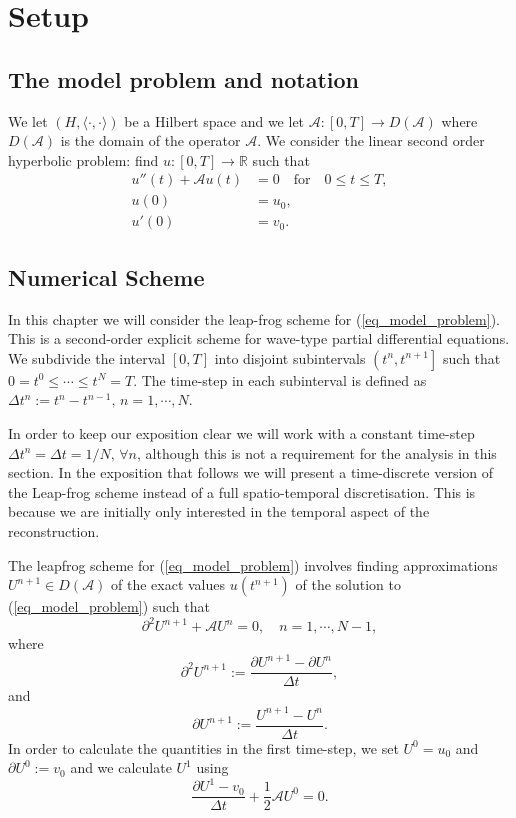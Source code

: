 \documentclass[12pt,a4paper]{article}
\numberwithin{equation}{section}
\theoremstyle{definition}
\newcommand{\qp}[1]{\left(#1\right)}
\newcommand{\qpb}[1]{\left(#1\right]}
\newcommand{\qb}[1]{\left[#1\right]}
\begin{document}
\section{Setup}\label{sec:setup}
\subsection{The model problem and notation}\label{subsec_modelprob}
We let $\qp{H,\langle \cdot,\cdot\rangle}$ be a Hilbert space and we let $\mathcal{A}:\qb{0,T}\rightarrow D\qp{\mathcal{A}}$ where $D\qp{\mathcal{A}}$ is the domain of the operator $\mathcal{A}$.  We consider the linear second order hyperbolic problem: find $u:\qb{0,T}\rightarrow \mathbb{R}$ such that
\begin{equation}\label{eq_model_problem}
\begin{aligned}
u''\qp{t}+\mathcal{A}u\qp{t}&=0\quad\text{for}\quad 0\leq t\leq T,\\
u\qp{0}&=u_0,\\
u'\qp{0}&=v_0.
\end{aligned}
\end{equation}

\subsection{Numerical Scheme}\label{subsect_leapfrog}
In this chapter we will consider  the leap-frog scheme for  (\ref{eq_model_problem}).  This is a second-order explicit scheme for wave-type partial differential equations.  We  subdivide the interval $\qb{0,T}$ into disjoint subintervals $\qpb{t^n, t^{n+1}}$ such that $0=t^0\leq\cdots\leq t^N=T$. The time-step in each subinterval is defined as $\Delta t^n := t^n-t^{n-1},\, n=1,\cdots,N$. 

In order to keep our exposition clear we will work with a constant time-step  $\Delta t^n = \Delta  t = 1/N ,\, \forall n$, although this is not a requirement for the analysis in this section. 
In the exposition that follows we will present a time-discrete version of the Leap-frog scheme instead of a full spatio-temporal discretisation.  This is because we are initially only interested in the temporal aspect of the reconstruction.  

The leapfrog scheme for (\ref{eq_model_problem}) involves finding approximations $U^{n+1}\in D\qp{\mathcal{A}}$ of the exact values $u\qp{t^{n+1}}$ of the solution to (\ref{eq_model_problem}) such that
\begin{equation}\label{eq_model_discrete}
\partial^2U^{n+1}+\mathcal{A}U^n=0,\quad n= 1,\cdots, N-1, 
\end{equation}
where
\begin{equation}
\partial^2U^{n+1}:=\frac{\partial U^{n+1}-\partial U^n}{\Delta t},
\end{equation}
and 
\begin{equation}
\partial U^{n+1}:= \frac{U^{n+1}-U^n}{\Delta t}.
\end{equation}
In order to calculate the quantities in the first time-step, we set $U^0=u_0$ and $\partial U^0:= v_0$ and we calculate $U^1$ using
\begin{equation}
\frac{\partial U^1 - v_0}{\Delta t} + \frac{1}{2}\mathcal{A}U^0 =0.
\end{equation}
\end{document}

